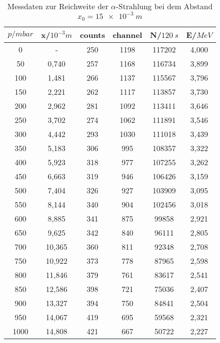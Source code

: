 \begin{table}[h!]
  \centering
  \caption{Messdaten zur Reichweite der $\alpha$-Strahlung bei dem Abstand $x_{\text{0}}=\SI{15e-3}{m}$}
  \label{tab:reichweite15}
  \begin{tabular}{c c c c c c}
    \toprule
      $p/mbar$ & x/$10^{-3}m$  &  counts &  channel &  N/$\SI{120}{s}$ & E/$MeV$   \\
      \midrule
         0     &      -   &   250   &   1198   &    117202   &  4,000  \\
        50     &   0,740  &   257   &   1168   &    116734   &  3,899  \\
       100     &   1,481  &   266   &   1137   &    115567   &  3,796  \\
       150     &   2,221  &   262   &   1117   &    113857   &  3,730  \\
       200     &   2,962  &   281   &   1092   &    113411   &  3,646  \\
       250     &   3,702  &   274   &   1062   &    111891   &  3,546  \\
       300     &   4,442  &   293   &   1030   &    111018   &  3,439  \\
       350     &   5,183  &   306   &   995    &    108357   &  3,322  \\
       400     &   5,923  &   318   &   977    &    107255   &  3,262  \\
       450     &   6,663  &   319   &   946    &    106426   &  3,159  \\
       500     &   7,404  &   326   &   927    &    103909   &  3,095  \\
       550     &   8,144  &   340   &   904    &    102456   &  3,018  \\
       600     &   8,885  &   341   &   875    &     99858   &  2,921  \\
       650     &   9,625  &   342   &   840    &     96111   &  2,805  \\
       700     &  10,365  &   360   &   811    &     92348   &  2,708  \\
       750     &  10,922  &   373   &   778    &     87965   &  2,598  \\
       800     &  11,846  &   379   &   761    &     83617   &  2,541  \\
       850     &  12,586  &   398   &   721    &     75036   &  2,407  \\
       900     &  13,327  &   394   &   750    &     84841   &  2,504  \\
       950     &  14,067  &   419   &   695    &     59568   &  2,321  \\
      1000     &  14,808  &   421   &   667    &     50722   &  2,227  \\

    \bottomrule
  \end{tabular}
\end{table}

%
